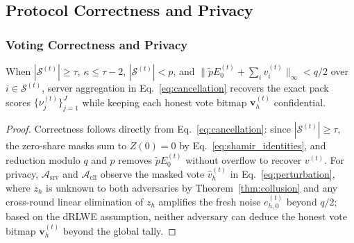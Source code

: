 \subsection{Protocol Correctness and Privacy}

\subsubsection{Voting Correctness and Privacy}
\begin{lemma}
\label{lem:vote}
When $|\mathcal{S}^{(t)}| \ge \tau$, $\kappa \le \tau - 2$, $|\mathcal{S}^{(t)}| < p$, and $\|\tilde{p} E_0^{(t)} + \sum_{i} v_i^{(t)}\|_\infty < q/2$ over $i \in \mathcal{S}^{(t)}$, server aggregation in Eq.~\eqref{eq:cancellation} recovers the exact pack scores $\{\nu_j^{(t)}\}_{j=1}^J$ while keeping each honest vote bitmap $\mathbf{v}_h^{(t)}$ confidential.
\end{lemma}
\begin{proof}
Correctness follows directly from Eq.~\eqref{eq:cancellation}: since $|\mathcal{S}^{(t)}| \ge \tau$, the zero-share masks sum to $Z(0)=0$ by Eq.~\eqref{eq:shamir_identities}, and reduction modulo $q$ and $p$ removes $\tilde{p}E_0^{(t)}$ without overflow to recover $v^{(t)}$. For privacy, $\mathcal{A}_{\mathrm{srv}}$ and $\mathcal{A}_{\mathrm{cli}}$ observe the masked vote $\hat{v}_h^{(t)}$ in Eq.~\eqref{eq:perturbation}, where $z_h$ is unknown to both adversaries by Theorem~\ref{thm:collusion} and any cross-round linear elimination of $z_h$ amplifies the fresh noise $e_{h,0}^{(t)}$ beyond $q/2$; based on the dRLWE assumption, neither adversary can deduce the honest vote bitmap $\mathbf{v}_h^{(t)}$ beyond the global tally.
\end{proof}


